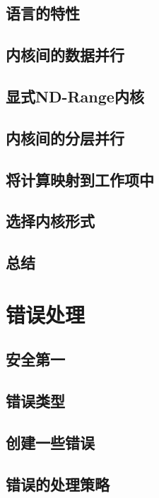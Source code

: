 \documentclass[11pt,a4paper,UTF8]{ctexart}
\begin{document}
		\subsection{语言的特性}
		
		\subsection{内核间的数据并行}
		
		\subsection{显式ND-Range内核}
		
		\subsection{内核间的分层并行}
		
		\subsection{将计算映射到工作项中}
		
		\subsection{选择内核形式}
		
		\subsection{总结}
		
	\section{错误处理}
	
		\subsection{安全第一}
		
		\subsection{错误类型}
		
		\subsection{创建一些错误}
		
		\subsection{错误的处理策略}
		
\end{document}
